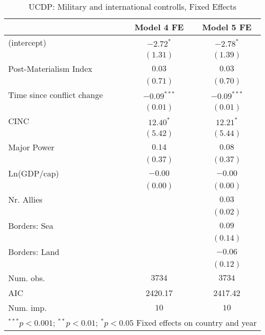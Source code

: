 
\begin{table}
\begin{center}
\begin{tabular}{l c c}
\toprule
 & Model 4 FE & Model 5 FE \\
\midrule
(intercept)                & $-2.72^{*}$   & $-2.78^{*}$   \\
                           & $(1.31)$      & $(1.39)$      \\
Post-Materialism Index     & $0.03$        & $0.03$        \\
                           & $(0.71)$      & $(0.70)$      \\
Time since conflict change & $-0.09^{***}$ & $-0.09^{***}$ \\
                           & $(0.01)$      & $(0.01)$      \\
CINC                       & $12.40^{*}$   & $12.21^{*}$   \\
                           & $(5.42)$      & $(5.44)$      \\
Major Power                & $0.14$        & $0.08$        \\
                           & $(0.37)$      & $(0.37)$      \\
Ln(GDP/cap)                & $-0.00$       & $-0.00$       \\
                           & $(0.00)$      & $(0.00)$      \\
Nr. Allies                 &               & $0.03$        \\
                           &               & $(0.02)$      \\
Borders: Sea               &               & $0.09$        \\
                           &               & $(0.14)$      \\
Borders: Land              &               & $-0.06$       \\
                           &               & $(0.12)$      \\
\midrule
Num. obs.                  & $3734$        & $3734$        \\
AIC                        & 2420.17       & 2417.42       \\
Num. imp.                  & $10$          & $10$          \\
\bottomrule
\multicolumn{3}{l}{\scriptsize{$^{***}p<0.001$; $^{**}p<0.01$; $^{*}p<0.05$ 
 Fixed effects on country and year}}
\end{tabular}
\caption{UCDP: Military and international controlls, Fixed Effects}
\label{UCDP_2_FE_PM}
\end{center}
\end{table}
